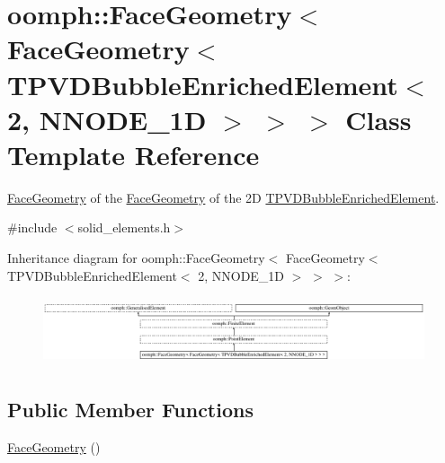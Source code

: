 \hypertarget{classoomph_1_1FaceGeometry_3_01FaceGeometry_3_01TPVDBubbleEnrichedElement_3_012_00_01NNODE__1D_01_4_01_4_01_4}{}\section{oomph\+:\+:Face\+Geometry$<$ Face\+Geometry$<$ T\+P\+V\+D\+Bubble\+Enriched\+Element$<$ 2, N\+N\+O\+D\+E\+\_\+1D $>$ $>$ $>$ Class Template Reference}
\label{classoomph_1_1FaceGeometry_3_01FaceGeometry_3_01TPVDBubbleEnrichedElement_3_012_00_01NNODE__1D_01_4_01_4_01_4}


\hyperlink{classoomph_1_1FaceGeometry}{Face\+Geometry} of the \hyperlink{classoomph_1_1FaceGeometry}{Face\+Geometry} of the 2D \hyperlink{classoomph_1_1TPVDBubbleEnrichedElement}{T\+P\+V\+D\+Bubble\+Enriched\+Element}.  




{\ttfamily \#include $<$solid\+\_\+elements.\+h$>$}

Inheritance diagram for oomph\+:\+:Face\+Geometry$<$ Face\+Geometry$<$ T\+P\+V\+D\+Bubble\+Enriched\+Element$<$ 2, N\+N\+O\+D\+E\+\_\+1D $>$ $>$ $>$\+:\begin{figure}[H]
\begin{center}
\leavevmode
\includegraphics[height=2.028986cm]{classoomph_1_1FaceGeometry_3_01FaceGeometry_3_01TPVDBubbleEnrichedElement_3_012_00_01NNODE__1D_01_4_01_4_01_4}
\end{center}
\end{figure}
\subsection*{Public Member Functions}
\begin{DoxyCompactItemize}
\item 
\hyperlink{classoomph_1_1FaceGeometry_3_01FaceGeometry_3_01TPVDBubbleEnrichedElement_3_012_00_01NNODE__1D_01_4_01_4_01_4_a7e110c7172c8a52d198c78f2f1a3f3bb}{Face\+Geometry} ()
\end{DoxyCompactItemize}
